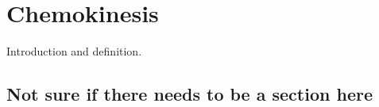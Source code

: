 \chapter{Chemokinesis}\label{ch:chemokinesis}
Introduction and definition.\newline
\lipsum[1-5]


\section{Not sure if there needs to be a section here}
